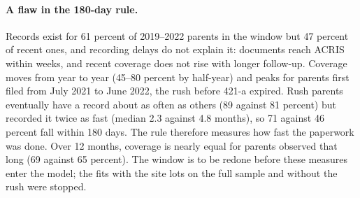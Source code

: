 \paragraph{A flaw in the 180-day rule.} Records exist for 61 percent of
2019--2022 parents in the window but 47 percent of recent ones, and recording
delays do not explain it: documents reach ACRIS within weeks, and recent
coverage does not rise with longer follow-up. Coverage moves from year to year
(45--80 percent by half-year) and peaks for parents first filed from July 2021
to June 2022, the rush before 421-a expired. Rush parents eventually have a
record about as often as others (89 against 81 percent) but recorded it twice
as fast (median 2.3 against 4.8 months), so 71 against 46 percent fall within
180 days. The rule therefore measures how fast the paperwork was done. Over 12
months, coverage is nearly equal for parents observed that long (69 against 65
percent). The window is to be redone before these measures enter the model;
the fits with the site lots on the full sample and without the rush were
stopped.
